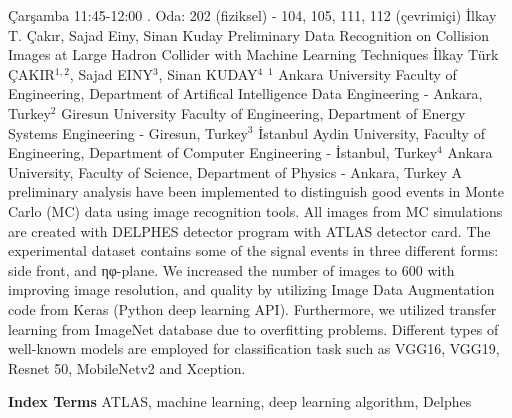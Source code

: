 
    \begin{abstract_basarim}
    {Çarşamba 11:45-12:00}
    {.}
    {Oda: 202 (fiziksel) - 104, 105, 111, 112 (çevrimiçi)}
    {İlkay T. Çakır, Sajad Einy, Sinan Kuday}
    {Preliminary Data Recognition on Collision Images at Large Hadron Collider with Machine Learning Techniques}
    {%
    İlkay Türk ÇAKIR$^{1,2}$, Sajad EINY$^{3}$, Sinan KUDAY$^{4}$}
    {%
    }
    {%
    $^1$ Ankara University Faculty of Engineering, Department of Artifical Intelligence Data Engineering - Ankara, Turkey\newline{}$^2$ Giresun University Faculty of Engineering, Department of Energy Systems Engineering - Giresun, Turkey\newline{}$^3$ İstanbul Aydin University, Faculty of Engineering, Department of Computer Engineering - İstanbul, Turkey\newline{}$^4$ Ankara University, Faculty of Science, Department of Physics - Ankara, Turkey}
    A preliminary analysis have been implemented to distinguish good events in Monte Carlo (MC) data using image recognition tools. All images from MC simulations are created with DELPHES detector program with ATLAS detector card. The experimental dataset contains some of the signal events in three different forms: side front, and ηφ-plane. We increased the number of images to 600 with improving image resolution, and quality by utilizing Image Data Augmentation code from Keras (Python deep learning API). Furthermore, we utilized transfer learning from ImageNet database due to overfitting problems. Different types of well-known models are employed for classification task such as VGG16, VGG19, Resnet 50, MobileNetv2 and Xception.  
    
            \textbf{Index Terms} \newline{}ATLAS, machine learning, deep learning algorithm, Delphes
    \end{abstract_basarim}
    